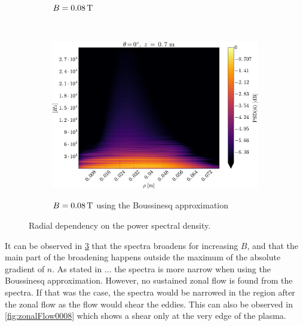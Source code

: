 \begin{figure}[htbp]
\begin{subfigure}[h]{0.45\textwidth}
        \label{fig:PSD2D008}
        \caption{$B=0.08\, \text{T}$}
    \end{subfigure}
    \\
    \begin{subfigure}[h]{0.45\textwidth}
        \centering
        \includegraphics[width=1.0\textwidth]{fig/results/zonal/PSD2D008B}
        \label{fig:PSD2D008B}
        \caption{$B=0.08\, \text{T}$ using the Boussinesq approximation}
    \end{subfigure}
    \caption{Radial dependency on the power spectral density.}
    \label{fig:PSD2D}
\end{figure}
%
It can be observed in \cref{fig:PSD2D} that the spectra broadens for increasing $B$, and that the main part of the broadening happens outside the maximum of the absolute gradient of $n$.
As stated in ...
the spectra is more narrow when using the Boussinesq approximation.
However, no sustained zonal flow is found from the spectra.
If that was the case, the spectra would be narrowed in the region after the zonal flow as the flow would shear the eddies.
This can also be observed in \cref{fig:zonalFlow0008} which shows a shear only at the very edge of the plasma.
%
